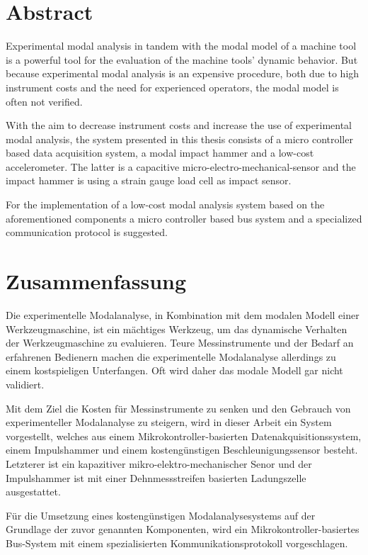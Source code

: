 \chapter*{Abstract}

Experimental modal analysis in tandem with the modal model of a machine tool is a powerful tool for the evaluation of the machine tools' dynamic behavior. But because experimental modal analysis is an expensive procedure, both due to high instrument costs and the need for experienced operators, the modal model is often not verified.

With the aim to decrease instrument costs and increase the use of experimental modal analysis, the system presented in this thesis consists of a micro controller based data acquisition system, a modal impact hammer and a low-cost accelerometer. The latter is a capacitive micro-electro-mechanical-sensor and the impact hammer is using a strain gauge load cell as impact sensor.

For the implementation of a low-cost modal analysis system based on the aforementioned components a micro controller based bus system and a specialized communication protocol is suggested.

\cleardoublepage{}
\chapter*{Zusammenfassung}

Die experimentelle Modalanalyse, in Kombination mit dem modalen Modell einer Werkzeugmaschine, ist ein mächtiges Werkzeug, um das dynamische Verhalten der Werkzeugmaschine zu evaluieren. Teure Messinstrumente und der Bedarf an erfahrenen Bedienern machen die experimentelle Modalanalyse allerdings zu einem kostspieligen Unterfangen. Oft wird daher das modale Modell gar nicht validiert.

Mit dem Ziel die Kosten für Messinstrumente zu senken und den Gebrauch von experimenteller Modalanalyse zu steigern, wird in dieser Arbeit ein System vorgestellt, welches aus einem Mikrokontroller-basierten Datenakquisitionssystem, einem Impulshammer und einem kostengünstigen Beschleunigungssensor besteht. Letzterer ist ein kapazitiver mikro-elektro-mechanischer Senor und der Impulshammer ist mit einer Dehnmessstreifen basierten Ladungszelle ausgestattet.

Für die Umsetzung eines kostengünstigen Modalanalysesystems auf der Grundlage der zuvor genannten Komponenten, wird ein Mikrokontroller-basiertes Bus-System mit einem spezialisierten Kommunikationsprotokoll vorgeschlagen.
